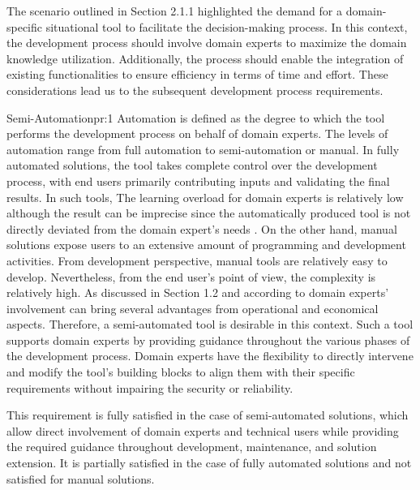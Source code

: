 The scenario outlined in Section 2.1.1 highlighted the demand for a domain-specific situational tool to facilitate the decision-making process. In this context, the development process should involve domain experts to maximize the domain knowledge utilization. Additionally, the process should enable the integration of existing functionalities to ensure efficiency in terms of time and effort. These considerations lead us to the subsequent development process requirements.

\begin{thesisdprequirement}{Semi-Automation}{pr:1}
Automation is defined as the degree to which the tool performs the development process on behalf of domain experts. The levels of automation range from full automation to semi-automation or manual. In fully automated solutions, the tool takes complete control over the development process, with end users primarily contributing inputs and validating the final results. In such tools, The learning overload for domain experts is relatively low although the result can be imprecise since the automatically produced tool is not directly deviated from the domain expert's needs \autocite{Aghaee2014}. On the other hand, manual solutions expose users to an extensive amount of programming and development activities. From development perspective, manual tools are relatively easy to develop. Nevertheless, from the end user’s point of view, the complexity is relatively high. As discussed in Section 1.2 and according to \autocite{Blili1998} domain experts' involvement can bring several advantages from operational and economical aspects. Therefore, a semi-automated tool is desirable in this context. Such a tool supports domain experts by providing guidance throughout the various phases of the development process. Domain experts have the flexibility to directly intervene and modify the tool's building blocks to align them with their specific requirements without impairing the security or reliability.

This requirement is fully satisfied in the case of semi-automated solutions, which allow direct involvement of domain experts and technical users while providing the required guidance throughout development, maintenance, and solution extension. It is partially satisfied in the case of fully automated solutions and not satisfied for manual solutions. 

\end{thesisdprequirement}

